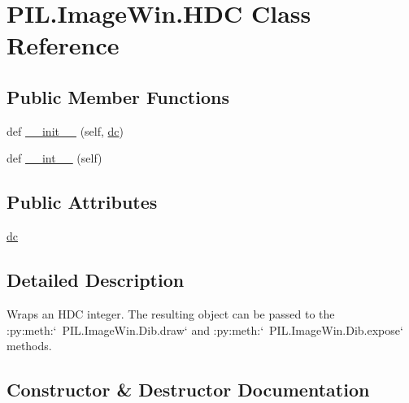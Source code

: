 \hypertarget{classPIL_1_1ImageWin_1_1HDC}{}\section{P\+I\+L.\+Image\+Win.\+H\+DC Class Reference}
\label{classPIL_1_1ImageWin_1_1HDC}
\subsection*{Public Member Functions}
\begin{DoxyCompactItemize}
\item 
def \hyperlink{classPIL_1_1ImageWin_1_1HDC_a25530ba8e18253a8f79b82d198132b09}{\+\_\+\+\_\+init\+\_\+\+\_\+} (self, \hyperlink{classPIL_1_1ImageWin_1_1HDC_a0e44246db6ee59daf62e1a720ce93c22}{dc})
\item 
def \hyperlink{classPIL_1_1ImageWin_1_1HDC_abd7a5bcf3eb7b3368aa4f7507da1a3c3}{\+\_\+\+\_\+int\+\_\+\+\_\+} (self)
\end{DoxyCompactItemize}
\subsection*{Public Attributes}
\begin{DoxyCompactItemize}
\item 
\hyperlink{classPIL_1_1ImageWin_1_1HDC_a0e44246db6ee59daf62e1a720ce93c22}{dc}
\end{DoxyCompactItemize}


\subsection{Detailed Description}
\begin{DoxyVerb}Wraps an HDC integer. The resulting object can be passed to the
:py:meth:`~PIL.ImageWin.Dib.draw` and :py:meth:`~PIL.ImageWin.Dib.expose`
methods.
\end{DoxyVerb}
 

\subsection{Constructor \& Destructor Documentation}
\mbox{\label{classPIL_1_1ImageWin_1_1HDC_a25530ba8e18253a8f79b82d198132b09}} 
